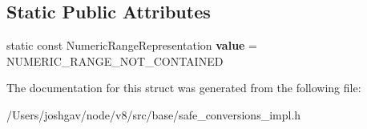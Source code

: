 \subsection*{Static Public Attributes}
\begin{DoxyCompactItemize}
\item 
static const Numeric\+Range\+Representation {\bfseries value} = N\+U\+M\+E\+R\+I\+C\+\_\+\+R\+A\+N\+G\+E\+\_\+\+N\+O\+T\+\_\+\+C\+O\+N\+T\+A\+I\+N\+ED\hypertarget{structv8_1_1base_1_1internal_1_1_static_dst_range_relation_to_src_range_3_01_dst_00_01_01_01_01_f0fdae55167d902ffa883ff4e7b2314f_a6694e2be53d3b6f4f86855ec8f2c865f}{}\label{structv8_1_1base_1_1internal_1_1_static_dst_range_relation_to_src_range_3_01_dst_00_01_01_01_01_f0fdae55167d902ffa883ff4e7b2314f_a6694e2be53d3b6f4f86855ec8f2c865f}

\end{DoxyCompactItemize}


The documentation for this struct was generated from the following file\+:\begin{DoxyCompactItemize}
\item 
/\+Users/joshgav/node/v8/src/base/safe\+\_\+conversions\+\_\+impl.\+h\end{DoxyCompactItemize}
